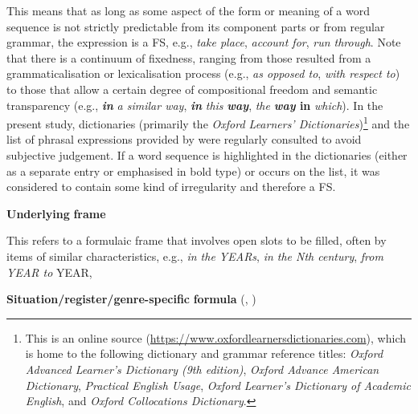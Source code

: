 This means that as long as some aspect of the form or meaning of a word sequence is not strictly predictable from its component parts or from regular grammar, the expression is a FS, e.g., \textit{take place}, \textit{account for}, \textit{run through}. Note that there is a continuum of fixedness, ranging from those resulted from a grammaticalisation or lexicalisation process (e.g., \textit{as opposed to}, \textit{with respect to}) to those that allow a certain degree of compositional freedom and semantic transparency (e.g., \textbf{\textit{in}} \textit{a similar way}, \textbf{\textit{in}} \textit{this} \textbf{\textit{way}}, \textit{the} \textbf{\textit{way} \textbf{in}} \textit{which}). In the present study, dictionaries (primarily the \textit{Oxford Learners’ Dictionaries})\footnote{ \textrm{This is an online source (}\url{https://www.oxfordlearnersdictionaries.com}\textrm{), which is home to the following dictionary and grammar reference titles:} \textrm{\textit{Oxford Advanced Learner’s Dictionary (9th edition)}}, \textrm{\textit{Oxford Advance American Dictionary}}, \textrm{\textit{Practical English Usage}}, \textrm{\textit{Oxford Learner’s Dictionary of Academic English}}\textrm{, and} \textrm{\textit{Oxford Collocations Dictionary}}.} and the list of phrasal expressions provided by \citet{MartinezSchmitt2012} were regularly consulted to avoid subjective judgement. If a word sequence is highlighted in the dictionaries (either as a separate entry or emphasised in bold type) or occurs on the list, it was considered to contain some kind of irregularity and therefore a FS.

\textbf{Underlying} \textbf{frame} \citep{Wray2008}

This refers to a formulaic frame that involves open slots to be filled, often by items of similar characteristics, e.g., \textit{in the YEARs}, \textit{in the Nth century}, \textit{from YEAR to} YEAR, 

\textbf{Situation/register/genre-specific} \textbf{formula} (\citealt{Wray2008}, \citealt{Buerki2016})

